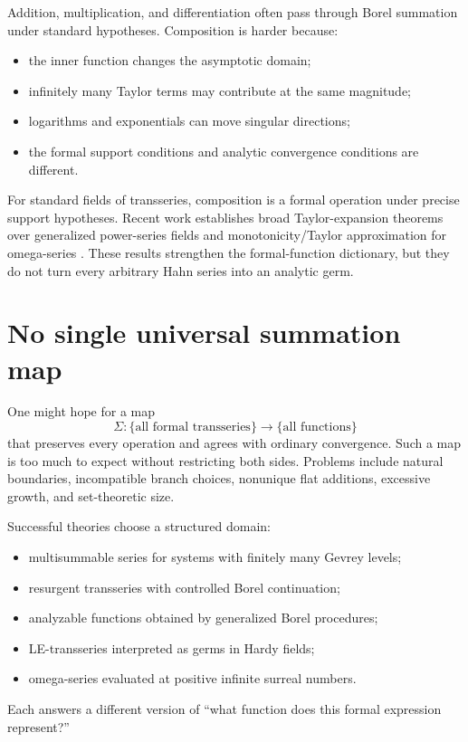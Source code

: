 \documentclass[11pt,openany]{book}
\theoremstyle{definition}
\theoremstyle{plain}
\theoremstyle{remark}
\begin{document}
Addition, multiplication, and differentiation often pass through Borel summation under standard hypotheses. Composition is harder because:
\begin{itemize}
 \item the inner function changes the asymptotic domain;
 \item infinitely many Taylor terms may contribute at the same magnitude;
 \item logarithms and exponentials can move singular directions;
 \item the formal support conditions and analytic convergence conditions are different.
\end{itemize}
For standard fields of transseries, composition is a formal operation under precise support hypotheses. Recent work establishes broad Taylor-expansion theorems over generalized power-series fields and monotonicity/Taylor approximation for omega-series \cite{bagayoko-mantova-taylor,mantova-monotonicity}. These results strengthen the formal-function dictionary, but they do not turn every arbitrary Hahn series into an analytic germ.

\section{No single universal summation map}

One might hope for a map
\[
 \Sigma:\{\text{all formal transseries}\}
 \longrightarrow\{\text{all functions}\}
\]
that preserves every operation and agrees with ordinary convergence. Such a map is too much to expect without restricting both sides. Problems include natural boundaries, incompatible branch choices, nonunique flat additions, excessive growth, and set-theoretic size.

Successful theories choose a structured domain:
\begin{itemize}
 \item multisummable series for systems with finitely many Gevrey levels;
 \item resurgent transseries with controlled Borel continuation;
 \item analyzable functions obtained by generalized Borel procedures;
 \item LE-transseries interpreted as germs in Hardy fields;
 \item omega-series evaluated at positive infinite surreal numbers.
\end{itemize}
Each answers a different version of ``what function does this formal expression represent?''
\end{document}
